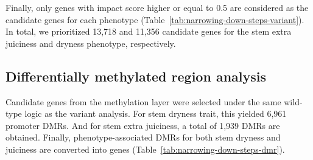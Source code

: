 \hspace{1em}Finally, only genes with impact score higher or equal to 0.5 are considered as the candidate genes for each phenotype (Table~\ref{tab:narrowing-down-steps-variant}). In total, we prioritized 13,718 and 11,356 candidate genes for the stem extra juiciness and dryness phenotype, respectively.

\subsection{Differentially methylated region analysis}
\hspace{1em}Candidate genes from the methylation layer were selected under the same wild-type logic as the variant analysis. For stem dryness trait, this yielded 6,961 promoter DMRs. And for stem extra juiciness, a total of 1,939 DMRs are obtained. Finally, phenotype-associated DMRs for both stem dryness and juiciness are converted into genes (Table~\ref{tab:narrowing-down-steps-dmr}).

